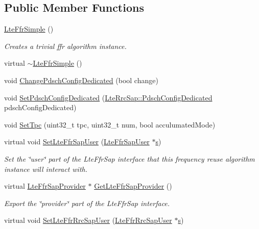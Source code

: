 \subsection*{Public Member Functions}
\begin{DoxyCompactItemize}
\item 
\hyperlink{classns3_1_1LteFfrSimple_aa82050141f03fd4811c0482cc70b7ab9}{Lte\+Ffr\+Simple} ()
\begin{DoxyCompactList}\small\item\em Creates a trivial ffr algorithm instance. \end{DoxyCompactList}\item 
virtual \hyperlink{classns3_1_1LteFfrSimple_ac9f59a05df350b7067143f235027ec85}{$\sim$\+Lte\+Ffr\+Simple} ()
\item 
void \hyperlink{classns3_1_1LteFfrSimple_a23f83819e8f2262243592a111f8668fe}{Change\+Pdsch\+Config\+Dedicated} (bool change)
\item 
void \hyperlink{classns3_1_1LteFfrSimple_a3da8348dd3cc4173464933912ae7524b}{Set\+Pdsch\+Config\+Dedicated} (\hyperlink{structns3_1_1LteRrcSap_1_1PdschConfigDedicated}{Lte\+Rrc\+Sap\+::\+Pdsch\+Config\+Dedicated} pdsch\+Config\+Dedicated)
\item 
void \hyperlink{classns3_1_1LteFfrSimple_a1fae5d33ee7c4429f10b66d6e92a1bc1}{Set\+Tpc} (uint32\+\_\+t tpc, uint32\+\_\+t num, bool acculumated\+Mode)
\item 
virtual void \hyperlink{classns3_1_1LteFfrSimple_a526880d56ff28f8e2ac42cab57fcd7a2}{Set\+Lte\+Ffr\+Sap\+User} (\hyperlink{classns3_1_1LteFfrSapUser}{Lte\+Ffr\+Sap\+User} $\ast$\hyperlink{generate__test__data__lte__sinr_8m_ad83eeb3a142285d1243a08c6b7026df8}{s})
\begin{DoxyCompactList}\small\item\em Set the \char`\"{}user\char`\"{} part of the Lte\+Ffr\+Sap interface that this frequency reuse algorithm instance will interact with. \end{DoxyCompactList}\item 
virtual \hyperlink{classns3_1_1LteFfrSapProvider}{Lte\+Ffr\+Sap\+Provider} $\ast$ \hyperlink{classns3_1_1LteFfrSimple_a508e2cd3a799c441683d4f8da3e33e21}{Get\+Lte\+Ffr\+Sap\+Provider} ()
\begin{DoxyCompactList}\small\item\em Export the \char`\"{}provider\char`\"{} part of the Lte\+Ffr\+Sap interface. \end{DoxyCompactList}\item 
virtual void \hyperlink{classns3_1_1LteFfrSimple_a03843a111e0e3253c87b9e62e57b8728}{Set\+Lte\+Ffr\+Rrc\+Sap\+User} (\hyperlink{classns3_1_1LteFfrRrcSapUser}{Lte\+Ffr\+Rrc\+Sap\+User} $\ast$\hyperlink{generate__test__data__lte__sinr_8m_ad83eeb3a142285d1243a08c6b7026df8}{s})

\end{DoxyCompactItemize}
